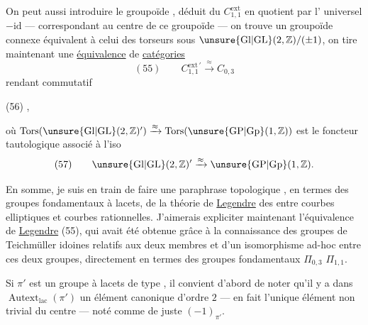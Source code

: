 On peut aussi introduire le groupoïde
, déduit du 
$C_{1,1}^{\mathrm{ext}}$ en 
quotient par l' universel $-\mathrm{id}$
--- correspondant au centre  
 de ce groupoïde --- on trouve
un groupoïde connexe équivalent 
à celui des torseurs sous 
$\unsure{\mathrm{Gl}|\mathrm{GL}}(2,\mathbb Z)/(\pm1)$,
 on tire maintenant une
\uline{équivalence} de \uline{catégories}
\[
(55)\qquad C_{1,1}^{\mathrm{ext}\,\prime}\xrightarrow{\approx}C_{0,3}
\]
rendant commutatif

(56)\quad
{},

où $\operatorname{Tors}(\unsure{\mathrm{Gl}|\mathrm{GL}}(2,\mathbb Z)')\xrightarrow{\approx}
\operatorname{Tors}(\unsure{\mathrm{GP}|\mathrm{Gp}}(1,\mathbb Z))$ est
le foncteur tautologique associé à l'iso
\[
(57)\qquad \unsure{\mathrm{Gl}|\mathrm{GL}}(2,\mathbb Z)'\xrightarrow{\approx}\unsure{\mathrm{GP}|\mathrm{Gp}}(1,\mathbb Z).
\]

En somme, je suis en train de faire une
paraphrase topologique , en termes
des groupes fondamentaux à lacets, de
la théorie de \uline{Legendre} des  entre
courbes elliptiques et courbes rationnelles.
J'aimerais expliciter maintenant l'équivalence
de \uline{Legendre} (55), qui avait
été obtenue grâce à la connaissance des
groupes de Teichmüller idoines relatifs
aux deux membres et d'un isomorphisme
ad-hoc entre ces deux groupes,
directement en termes des groupes
fondamentaux  $\Pi_{0,3}$  $\Pi_{1,1}$.

Si $\pi'$ est un groupe à lacets de type
, il convient d'abord de noter qu'il
y a dans $\operatorname{Autext}_{\mathrm{lac}}(\pi')$ un élément canonique
d'ordre $2$ --- en fait l'unique élément non trivial
du centre --- noté comme de juste $(-1)_{\pi'}$.


